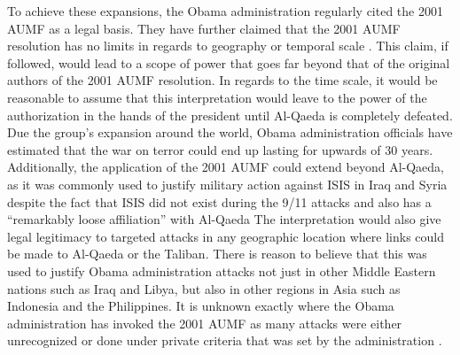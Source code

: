 \documentclass[12pt]{article}
\begin{document}
To achieve these expansions, the Obama administration regularly cited the 2001 AUMF as a legal basis.
They have further claimed that the 2001 AUMF resolution has no limits in regards to geography or temporal scale \autocite[108]{boyle2015}.
This claim, if followed, would lead to a scope of power that goes far beyond that of the original authors of the 2001 AUMF resolution.
In regards to the time scale, it would be reasonable to assume that this interpretation would leave to the power of the authorization in the hands of the president until Al-Qaeda is completely defeated.
Due the group's expansion around the world, Obama administration officials have estimated that the war on terror could end up lasting for upwards of 30 years.
Additionally, the application of the 2001 AUMF could extend beyond Al-Qaeda, as it was commonly used to justify military action against ISIS in Iraq and Syria despite the fact that ISIS did not exist during the 9/11 attacks and also has a ``remarkably loose affiliation'' with Al-Qaeda \autocite[111]{boyle2015}
The interpretation would also give legal legitimacy to targeted attacks in any geographic location where links could be made to Al-Qaeda or the Taliban.
There is reason to believe that this was used to justify Obama administration attacks not just in other Middle Eastern nations such as Iraq and Libya, but also in other regions in Asia such as Indonesia and the Philippines.
It is unknown exactly where the Obama administration has invoked the 2001 AUMF as many attacks were either unrecognized or done under private criteria that was set by the administration \autocite[109]{boyle2015}.
\end{document}
